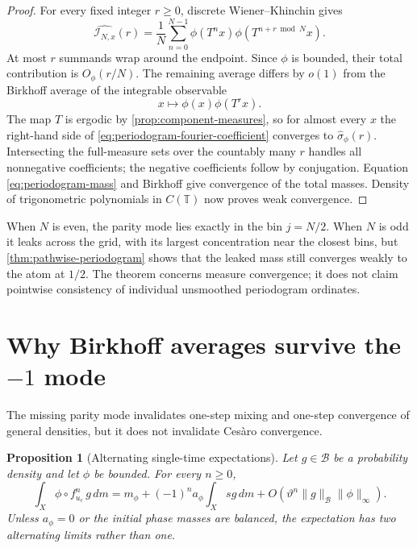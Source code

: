 \documentclass[11pt]{article}
\newtheorem{proposition}[theorem]{Proposition}
\theoremstyle{definition}
\theoremstyle{remark}
\newcommand{\T}{\mathbb T}
\newcommand{\uc}{u_{\mathrm c}}
\newcommand{\cB}{\mathcal B}
\begin{document}
\begin{proof}
For every fixed integer $r\ge0$, discrete Wiener--Khinchin gives
\begin{equation}\label{eq:periodogram-fourier-coefficient}
    \widehat{\mathcal I_{N,x}}(r)
    =\frac1N\sum_{n=0}^{N-1}
      \phi(T^nx)\phi(T^{n+r\bmod N}x).
\end{equation}
At most $r$ summands wrap around the endpoint.  Since $\phi$ is bounded, their total contribution is $O_\phi(r/N)$.  The remaining average differs by $o(1)$ from the Birkhoff average of the integrable observable
\[
    x\longmapsto\phi(x)\phi(T^rx).
\]
The map $T$ is ergodic by \cref{prop:component-measures}, so for almost every $x$ the right-hand side of \eqref{eq:periodogram-fourier-coefficient} converges to $\widehat\sigma_\phi(r)$.  Intersecting the full-measure sets over the countably many $r$ handles all nonnegative coefficients; the negative coefficients follow by conjugation.  Equation \eqref{eq:periodogram-mass} and Birkhoff give convergence of the total masses.  Density of trigonometric polynomials in $C(\T)$ now proves weak convergence.
\end{proof}

When $N$ is even, the parity mode lies exactly in the bin $j=N/2$.  When $N$ is odd it leaks across the grid, with its largest concentration near the closest bins, but \cref{thm:pathwise-periodogram} shows that the leaked mass still converges weakly to the atom at $1/2$.  The theorem concerns measure convergence; it does not claim pointwise consistency of individual unsmoothed periodogram ordinates.

\section{Why Birkhoff averages survive the \texorpdfstring{$-1$}{-1} mode}

The missing parity mode invalidates one-step mixing and one-step convergence of general densities, but it does not invalidate Ces\`aro convergence.

\begin{proposition}[Alternating single-time expectations]\label{prop:alternating-expectations}
Let $g\in\cB$ be a probability density and let $\phi$ be bounded.  For every $n\ge0$,
\begin{equation}\label{eq:alternating-expectation}
    \int_X\phi\circ f_{\uc}^n\,g\,dm
    =m_\phi+(-1)^na_\phi\int_Xsg\,dm
      +O\!\left(\vartheta^n\|g\|_{\cB}\|\phi\|_\infty\right).
\end{equation}
Unless $a_\phi=0$ or the initial phase masses are balanced, the expectation has two alternating limits rather than one.
\end{proposition}
\end{document}
